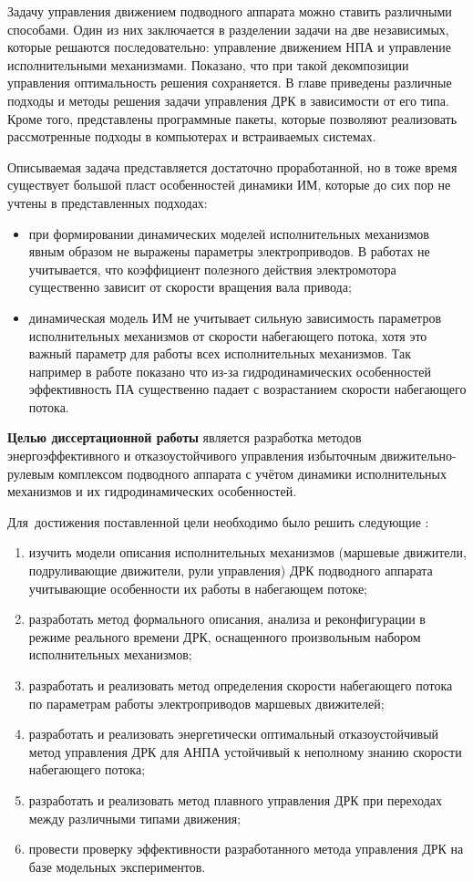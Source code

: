Задачу управления движением подводного аппарата можно ставить различными способами.
Один из них заключается в разделении задачи на две независимых, которые решаются последовательно: управление движением НПА и управление исполнительными механизмами.
Показано, что при такой декомпозиции управления оптимальность решения сохраняется.
В главе приведены различные подходы и методы решения задачи управления ДРК в зависимости от его типа.
Кроме того, представлены программные пакеты, которые позволяют реализовать рассмотренные подходы в компьютерах и встраиваемых системах. 

Описываемая задача представляется достаточно проработанной, но в тоже время существует большой пласт особенностей динамики ИМ, которые до сих пор не учтены в представленных подходах:
\begin{itemize}
    \item при формировании динамических моделей исполнительных механизмов явным образом не выражены параметры электроприводов. В работах не учитывается, что коэффициент полезного действия электромотора существенно зависит от скорости вращения вала привода;
    \item динамическая модель ИМ не учитывает сильную зависимость параметров исполнительных механизмов от скорости набегающего потока, хотя это важный параметр для работы всех исполнительных механизмов. Так например в работе \cite{palmer2008modelling} показано что из-за гидродинамических особенностей эффективность ПА существенно падает с возрастанием скорости набегающего потока.
\end{itemize}

\textbf{Целью диссертационной работы} является разработка методов энергоэффективного и отказоустойчивого управления избыточным движительно-рулевым комплексом подводного аппарата с учётом динамики исполнительных механизмов и их гидродинамических особенностей.

Для~достижения поставленной цели необходимо было решить следующие {\tasks}:
\begin{enumerate}[beginpenalty=10000] %
  \item изучить модели описания исполнительных механизмов (маршевые движители, подруливающие движители, рули управления) ДРК подводного аппарата учитывающие особенности их работы в набегающем потоке;
  \item разработать метод формального описания, анализа и реконфигурации в режиме реального времени ДРК, оснащенного произвольным набором исполнительных механизмов;
  \item разработать и реализовать метод определения скорости набегающего потока по параметрам работы электроприводов маршевых движителей;
  \item разработать и реализовать энергетически оптимальный отказоустойчивый метод управления ДРК для АНПА устойчивый к неполному знанию скорости набегающего потока;
  \item разработать и реализовать метод плавного управления ДРК при переходах между различными типами движения;
  \item провести проверку эффективности разработанного метода управления ДРК на базе модельных экспериментов.
\end{enumerate}

